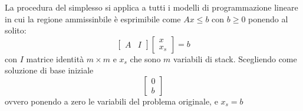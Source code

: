 \message{ !name(ro.tex)}\documentclass[a4paper,12pt, oneside]{book}
\begin{document}
La procedura del simplesso si applica a tutti i modelli di
programmazione lineare in cui la regione ammissinbile è esprimibile
come $Ax\leq b$ con $b\geq 0$ ponendo al solito:
\[\left[
    \begin{matrix}
      A & I
    \end{matrix}
  \right]\left[
    \begin{matrix}
      x\\
      x_s
    \end{matrix}
  \right]=b
\]
con $I$ matrice identità $m\times m$ e $x_s$ che sono $m$ variabili di
stack. Scegliendo come soluzione di base iniziale
\[\left[
    \begin{matrix}
      0\\
      b
    \end{matrix}
  \right]
\]
ovvero ponendo a zero le variabili del problema originale, e $x_s=b$
\end{document}
